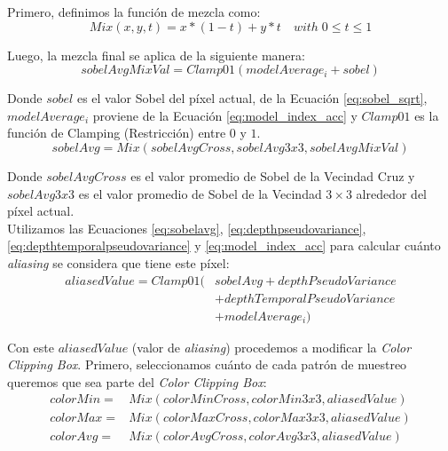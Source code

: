 \documentclass[pregrado]{tesis-usb} %
\begin{document}
Primero, definimos la función de mezcla como:
\begin{equation} \label{eq:mixfunction}
Mix(x,y,t)=x*(1-t)+y*t\quad with\; 0\leq t\leq 1
\end{equation} 

Luego, la mezcla final se aplica de la siguiente manera:
\begin{equation}\label{eq:sobelavgmixval}
sobelAvgMixVal=Clamp01(modelAverage_i+sobel) 
\end{equation}
 
Donde $sobel$ es el valor Sobel del píxel actual, de la Ecuación \ref{eq:sobel_sqrt}, $modelAverage_i$ proviene de la Ecuación \ref{eq:model_index_acc} y $Clamp01$ es la función de Clamping (Restricción) entre $0$ y $1$. \\

\begin{equation}\label{eq:sobelavg}
sobelAvg=Mix(sobelAvgCross, sobelAvg3x3, sobelAvgMixVal)
\end{equation}

Donde $sobelAvgCross$ es el valor promedio de Sobel de la Vecindad Cruz y $sobelAvg3x3$ es el valor promedio de Sobel de la Vecindad $3\times 3$ alrededor del píxel actual. \\ 

Utilizamos las Ecuaciones \ref{eq:sobelavg}, \ref{eq:depthpseudovariance}, \ref{eq:depthtemporalpseudovariance} y \ref{eq:model_index_acc} para calcular cuánto \textit{aliasing} se considera que tiene este píxel:
\begin{equation}\label{eq:aliasedvalue}
\begin{split}
aliasedValue=Clamp01 (& sobelAvg + depthPseudoVariance \\
 & + depthTemporalPseudoVariance \\
 & + modelAverage_i)
\end{split}
\end{equation}

Con este $aliasedValue$ (valor de \textit{aliasing}) procedemos a modificar la \textit{Color Clipping Box}. Primero, seleccionamos cuánto de cada patrón de muestreo queremos que sea parte del \textit{Color Clipping Box}:
\begin{equation}\label{eq:newcolors}
\begin{split}
colorMin= & Mix(colorMinCross,colorMin3x3,aliasedValue) \\
colorMax= & Mix(colorMaxCross,colorMax3x3,aliasedValue) \\
colorAvg= & Mix(colorAvgCross,colorAvg3x3,aliasedValue) \\
\end{split}
\end{equation}
\end{document}
